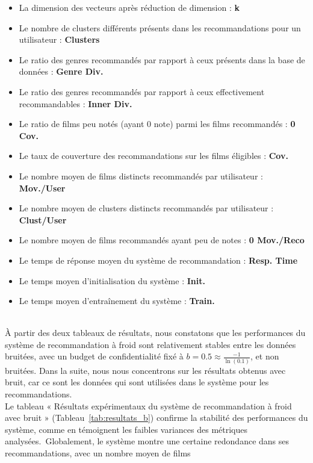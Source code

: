 \documentclass{article}
\begin{document}
    \begin{itemize}
    \item La dimension des vecteurs après réduction de dimension : \textbf{k}
    \item Le nombre de clusters différents présents dans les recommandations pour un utilisateur : \textbf{Clusters}
    \item Le ratio des genres recommandés par rapport à ceux présents dans la base de données : \textbf{Genre Div.}
    \item Le ratio des genres recommandés par rapport à ceux effectivement recommandables : \textbf{Inner Div.}
    \item Le ratio de films peu notés (ayant 0 note) parmi les films recommandés : \textbf{0 Cov.}
    \item Le taux de couverture des recommandations sur les films éligibles : \textbf{Cov.}
    \item Le nombre moyen de films distincts recommandés par utilisateur : \textbf{Mov./User}
    \item Le nombre moyen de clusters distincts recommandés par utilisateur : \textbf{Clust/User}
    \item Le nombre moyen de films recommandés ayant peu de notes : \textbf{0 Mov./Reco}
    \item Le temps de réponse moyen du système de recommandation : \textbf{Resp. Time}
    \item Le temps moyen d’initialisation du système : \textbf{Init.}
    \item Le temps moyen d’entraînement du système : \textbf{Train.}
    \end{itemize}
    $ $\\
    À partir des deux tableaux de résultats, nous constatons que les performances du système 
    de recommandation à froid sont relativement stables entre les données bruitées, avec un budget de confidentialité fixé à $b = 0.5 \approx \frac{-1}{\ln(0.1  )}$, et non bruitées. Dans 
    la suite, nous nous concentrons sur les résultats obtenus avec bruit, car ce sont les données qui 
    sont utilisées dans le système pour les recommandations.\\
    Le tableau « Résultats expérimentaux du système de recommandation à froid avec bruit » (Tableau~\ref{tab:resultats_b}) confirme la stabilité des performances 
    du système, comme en témoignent les faibles variances des métriques analysées.\
    Globalement, le système montre une certaine redondance dans ses recommandations, avec un nombre moyen de films 
\end{document}
